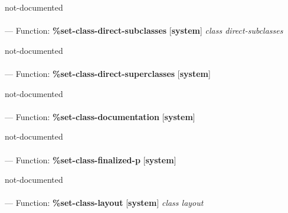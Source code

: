 \begin{adjustwidth}{5em}{5em}
not-documented
\end{adjustwidth}

\paragraph{}
\label{SYSTEM:SET-CLASS-DIRECT-SUBCLASSES}
--- Function: \textbf{\%set-class-direct-subclasses} [\textbf{system}] \textit{class direct-subclasses}

\begin{adjustwidth}{5em}{5em}
not-documented
\end{adjustwidth}

\paragraph{}
\label{SYSTEM:SET-CLASS-DIRECT-SUPERCLASSES}
--- Function: \textbf{\%set-class-direct-superclasses} [\textbf{system}] \textit{}

\begin{adjustwidth}{5em}{5em}
not-documented
\end{adjustwidth}

\paragraph{}
\label{SYSTEM:SET-CLASS-DOCUMENTATION}
--- Function: \textbf{\%set-class-documentation} [\textbf{system}] \textit{}

\begin{adjustwidth}{5em}{5em}
not-documented
\end{adjustwidth}

\paragraph{}
\label{SYSTEM:SET-CLASS-FINALIZED-P}
--- Function: \textbf{\%set-class-finalized-p} [\textbf{system}] \textit{}

\begin{adjustwidth}{5em}{5em}
not-documented
\end{adjustwidth}

\paragraph{}
\label{SYSTEM:SET-CLASS-LAYOUT}
--- Function: \textbf{\%set-class-layout} [\textbf{system}] \textit{class layout}

